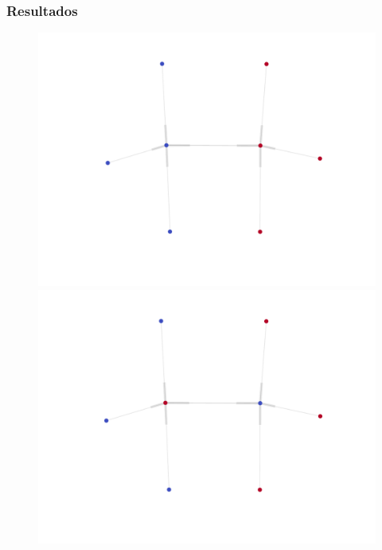 \begin{frame}
  \frametitle{Resultados}

  \begin{figure}
  \centering
  \begin{minipage}{4cm}
    \includegraphics[width=\textwidth]{./figures/21N0}
  \end{minipage}
  \begin{minipage}{4cm}
    \includegraphics[width=\textwidth]{./figures/21N1}
  \end{minipage}
  \begin{minipage}{4cm}

\end{minipage}
\end{figure}
\end{frame}
